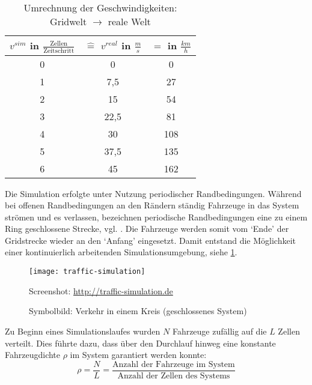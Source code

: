 \begin{table}[ht]
\begin{center}
\setlength{\tabcolsep}{0.5em} %
{\renewcommand{\arraystretch}{1.2}%
\begin{tabular}{| c | c | c |}
\hline 
$v^{sim}$ in $\frac{\text{Zellen}}{\text{Zeitschritt}}$ & $\widehat{=}$ $v^{real}$ in $\frac{m}{s}$ & $=$ in $\frac{km}{h}$ \\ \hline 
0 & 0 & 0 \\ \hline
1 & 7,5 & 27 \\ \hline
2 & 15 & 54 \\ \hline
3 & 22,5 & 81 \\ \hline
4 & 30 & 108 \\ \hline
5 & 37,5 & 135 \\ \hline
6 & 45 & 162 \\ \hline
\end{tabular}
}
\caption{Umrechnung der Geschwindigkeiten: Gridwelt $\rightarrow$ reale Welt}
\end{center}
\label{tab:umrechnung-zelle-kmh}
\end{table}

Die Simulation erfolgte unter Nutzung periodischer Randbedingungen. 
Während bei offenen Randbedingungen an den Rändern ständig Fahrzeuge in das System strömen und es verlassen, bezeichnen periodische Randbedingungen eine zu einem Ring geschlossene Strecke, vgl. \cite[S. 6]{spahn-da}.
Die Fahrzeuge werden somit vom \enquote*{Ende} der Gridstrecke wieder an den \enquote*{Anfang} eingesetzt. 
Damit entstand die Möglichkeit einer kontinuierlich arbeitenden Simulationsumgebung, siehe \cref{figure:traffic-simulation}.

\begin{figure}[hptb]
 \centering
 \texttt{[image: traffic-simulation]}
 \caption[Darstellung des Verkehrs in einem geschlossenen System]
 		{Symbolbild: Verkehr in einem Kreis (geschlossenes System)}{\footnotesize Screenshot: \url{http://traffic-simulation.de}}
 \label{figure:traffic-simulation}
\end{figure} 

Zu Beginn eines Simulationslaufes wurden $N$ Fahrzeuge zufällig auf die $L$ Zellen verteilt.
Dies führte dazu, dass über den Durchlauf hinweg eine konstante Fahrzeugdichte $\rho$ im System garantiert werden konnte:
\begin{equation}
\rho = \dfrac{N}{L} = \dfrac{\text{Anzahl der Fahrzeuge im System}}{\text{Anzahl der Zellen des Systems}}
\nonumber
\end{equation}


